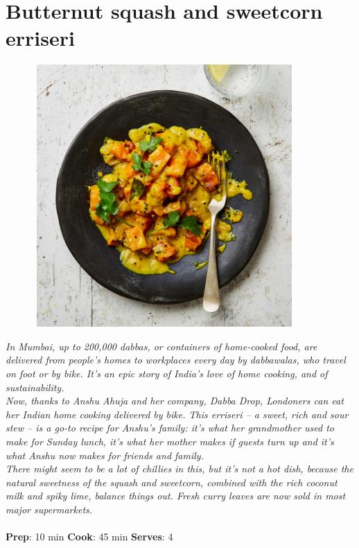 \documentclass{book}
\begin{document}
\section{Butternut squash and sweetcorn erriseri}
\begin{figure}
\centering\includegraphics[width=10cm,height=10cm,keepaspectratio]{Recipe_Pictures/Butternut_squash_and_sweetcorn_erriseri.png}
\end{figure}
\emph{In Mumbai, up to 200,000 dabbas, or containers of home-cooked food, are delivered from people’s homes to workplaces every day by dabbawalas, who travel on foot or by bike. It’s an epic story of India’s love of home cooking, and of sustainability. \\ 
Now, thanks to Anshu Ahuja and her company, Dabba Drop, Londoners can eat her Indian home cooking delivered by bike. This erriseri – a sweet, rich and sour stew – is a go-to recipe for Anshu’s family: it’s what her grandmother used to make for Sunday lunch, it’s what her mother makes if guests turn up and it’s what Anshu now makes for friends and family.\\ 
There might seem to be a lot of chillies in this, but it’s not a hot dish, because the natural sweetness of the squash and sweetcorn, combined with the rich coconut milk and spiky lime, balance things out. Fresh curry leaves are now sold in most major supermarkets.}\\\\ 
\textbf{Prep}: 10 min
\textbf{Cook}: 45 min
\textbf{Serves}: 4
\end{document}
